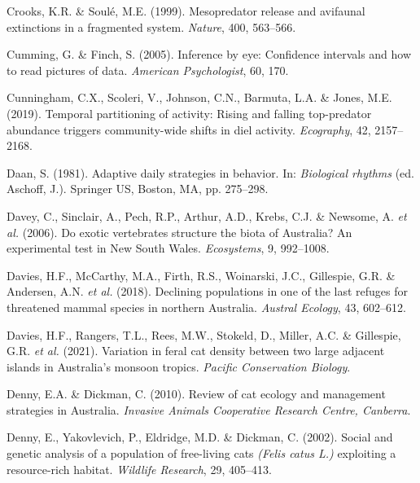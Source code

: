 \documentclass[11pt,a4paper,titlepage,twoside,openright]{style/unimelbthesis}
\begin{document}
\begin{mainmatter}
\leavevmode\hypertarget{ref-crooks1999mesopredator}{}%
Crooks, K.R. \& Soulé, M.E. (1999). Mesopredator release and avifaunal extinctions in a fragmented system. \emph{Nature}, 400, 563--566.

\leavevmode\hypertarget{ref-cumming2005inference}{}%
Cumming, G. \& Finch, S. (2005). Inference by eye: Confidence intervals and how to read pictures of data. \emph{American Psychologist}, 60, 170.

\leavevmode\hypertarget{ref-cunningham2019temporal}{}%
Cunningham, C.X., Scoleri, V., Johnson, C.N., Barmuta, L.A. \& Jones, M.E. (2019). Temporal partitioning of activity: Rising and falling top-predator abundance triggers community-wide shifts in diel activity. \emph{Ecography}, 42, 2157--2168.

\leavevmode\hypertarget{ref-daan1981adaptive}{}%
Daan, S. (1981). Adaptive daily strategies in behavior. In: \emph{Biological rhythms} (ed. Aschoff, J.). Springer US, Boston, MA, pp. 275--298.

\leavevmode\hypertarget{ref-davey2006exotic}{}%
Davey, C., Sinclair, A., Pech, R.P., Arthur, A.D., Krebs, C.J. \& Newsome, A. \emph{et al.} (2006). Do exotic vertebrates structure the biota of Australia? An experimental test in New South Wales. \emph{Ecosystems}, 9, 992--1008.

\leavevmode\hypertarget{ref-davies2018declining}{}%
Davies, H.F., McCarthy, M.A., Firth, R.S., Woinarski, J.C., Gillespie, G.R. \& Andersen, A.N. \emph{et al.} (2018). Declining populations in one of the last refuges for threatened mammal species in northern Australia. \emph{Austral Ecology}, 43, 602--612.

\leavevmode\hypertarget{ref-davies2021variation}{}%
Davies, H.F., Rangers, T.L., Rees, M.W., Stokeld, D., Miller, A.C. \& Gillespie, G.R. \emph{et al.} (2021). Variation in feral cat density between two large adjacent islands in Australia's monsoon tropics. \emph{Pacific Conservation Biology}.

\leavevmode\hypertarget{ref-denny2010review}{}%
Denny, E.A. \& Dickman, C. (2010). Review of cat ecology and management strategies in Australia. \emph{Invasive Animals Cooperative Research Centre, Canberra}.

\leavevmode\hypertarget{ref-denny2002social}{}%
Denny, E., Yakovlevich, P., Eldridge, M.D. \& Dickman, C. (2002). Social and genetic analysis of a population of free-living cats \emph{(Felis catus L.)} exploiting a resource-rich habitat. \emph{Wildlife Research}, 29, 405--413.


\end{mainmatter}
\end{document}
